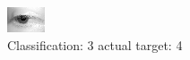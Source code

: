 \begin{figure}[h!]
\begin{center}
\includegraphics[width=0.60\columnwidth]{figures/ID2593_class_3_target_4.png}
\end{center}
\caption{ Classification: 3 actual target: 4}
\label{fig:ID2593_class_3_target_4}
\end{figure}
